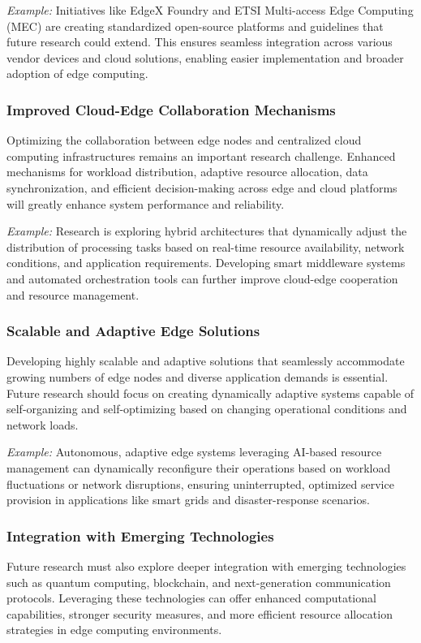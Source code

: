 \documentclass[runningheads]{llncs}
\begin{document}
\noindent\textit{Example:} Initiatives like EdgeX Foundry and ETSI Multi-access Edge Computing (MEC) are creating standardized open-source platforms and guidelines that future research could extend. This ensures seamless integration across various vendor devices and cloud solutions, enabling easier implementation and broader adoption of edge computing.

\subsubsection{Improved Cloud-Edge Collaboration Mechanisms}
Optimizing the collaboration between edge nodes and centralized cloud computing infrastructures remains an important research challenge. Enhanced mechanisms for workload distribution, adaptive resource allocation, data synchronization, and efficient decision-making across edge and cloud platforms will greatly enhance system performance and reliability.

\noindent\textit{Example:} Research is exploring hybrid architectures that dynamically adjust the distribution of processing tasks based on real-time resource availability, network conditions, and application requirements. Developing smart middleware systems and automated orchestration tools can further improve cloud-edge cooperation and resource management.

\subsubsection{Scalable and Adaptive Edge Solutions}
Developing highly scalable and adaptive solutions that seamlessly accommodate growing numbers of edge nodes and diverse application demands is essential. Future research should focus on creating dynamically adaptive systems capable of self-organizing and self-optimizing based on changing operational conditions and network loads.

\noindent\textit{Example:} Autonomous, adaptive edge systems leveraging AI-based resource management can dynamically reconfigure their operations based on workload fluctuations or network disruptions, ensuring uninterrupted, optimized service provision in applications like smart grids and disaster-response scenarios.

\subsubsection{Integration with Emerging Technologies}
Future research must also explore deeper integration with emerging technologies such as quantum computing, blockchain, and next-generation communication protocols. Leveraging these technologies can offer enhanced computational capabilities, stronger security measures, and more efficient resource allocation strategies in edge computing environments.
\end{document}
